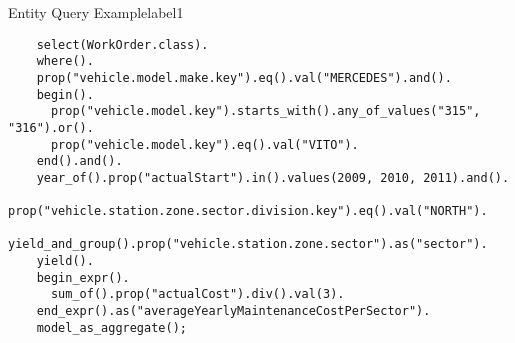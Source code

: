   \begin{code}{Entity Query Example}{label1}
  \begin{lstlisting}
    select(WorkOrder.class).
    where().
    prop("vehicle.model.make.key").eq().val("MERCEDES").and().
    begin().
      prop("vehicle.model.key").starts_with().any_of_values("315", "316").or().
      prop("vehicle.model.key").eq().val("VITO").
    end().and().
    year_of().prop("actualStart").in().values(2009, 2010, 2011).and().
    prop("vehicle.station.zone.sector.division.key").eq().val("NORTH").
    yield_and_group().prop("vehicle.station.zone.sector").as("sector").
    yield().
    begin_expr().
      sum_of().prop("actualCost").div().val(3).
    end_expr().as("averageYearlyMaintenanceCostPerSector").
    model_as_aggregate();
  \end{lstlisting}
  \end{code}
  
  


